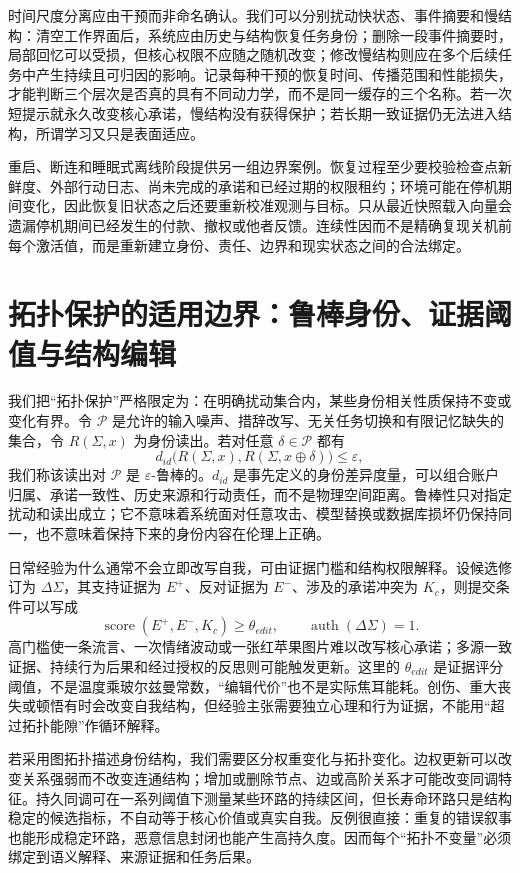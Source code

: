 时间尺度分离应由干预而非命名确认。我们可以分别扰动快状态、事件摘要和慢结构：清空工作界面后，系统应由历史与结构恢复任务身份；删除一段事件摘要时，局部回忆可以受损，但核心权限不应随之随机改变；修改慢结构则应在多个后续任务中产生持续且可归因的影响。记录每种干预的恢复时间、传播范围和性能损失，才能判断三个层次是否真的具有不同动力学，而不是同一缓存的三个名称。若一次短提示就永久改变核心承诺，慢结构没有获得保护；若长期一致证据仍无法进入结构，所谓学习又只是表面适应。

重启、断连和睡眠式离线阶段提供另一组边界案例。恢复过程至少要校验检查点新鲜度、外部行动日志、尚未完成的承诺和已经过期的权限租约；环境可能在停机期间变化，因此恢复旧状态之后还要重新校准观测与目标。只从最近快照载入向量会遗漏停机期间已经发生的付款、撤权或他者反馈。连续性因而不是精确复现关机前每个激活值，而是重新建立身份、责任、边界和现实状态之间的合法绑定。

\section{拓扑保护的适用边界：鲁棒身份、证据阈值与结构编辑}
\label{sec:section_6628}

我们把“拓扑保护”严格限定为：在明确扰动集合内，某些身份相关性质保持不变或变化有界。令 $\mathcal{P}$ 是允许的输入噪声、措辞改写、无关任务切换和有限记忆缺失的集合，令 $R(\Sigma,x)$ 为身份读出。若对任意 $\delta\in\mathcal{P}$ 都有
\[
d_{id}\bigl(R(\Sigma,x),R(\Sigma,x\oplus\delta)\bigr)\le\varepsilon,
\]
我们称该读出对 $\mathcal{P}$ 是 $\varepsilon$-鲁棒的。$d_{id}$ 是事先定义的身份差异度量，可以组合账户归属、承诺一致性、历史来源和行动责任，而不是物理空间距离。鲁棒性只对指定扰动和读出成立；它不意味着系统面对任意攻击、模型替换或数据库损坏仍保持同一，也不意味着保持下来的身份内容在伦理上正确。

日常经验为什么通常不会立即改写自我，可由证据门槛和结构权限解释。设候选修订为 $\Delta\Sigma$，其支持证据为 $E^+$、反对证据为 $E^-$、涉及的承诺冲突为 $K_c$，则提交条件可以写成
\[
\operatorname{score}(E^+,E^-,K_c)\ge \theta_{edit},
\qquad
\operatorname{auth}(\Delta\Sigma)=1.
\]
高门槛使一条流言、一次情绪波动或一张红苹果图片难以改写核心承诺；多源一致证据、持续行为后果和经过授权的反思则可能触发更新。这里的 $\theta_{edit}$ 是证据评分阈值，不是温度乘玻尔兹曼常数，“编辑代价”也不是实际焦耳能耗。创伤、重大丧失或顿悟有时会改变自我结构，但经验主张需要独立心理和行为证据，不能用“超过拓扑能隙”作循环解释。

若采用图拓扑描述身份结构，我们需要区分权重变化与拓扑变化。边权更新可以改变关系强弱而不改变连通结构；增加或删除节点、边或高阶关系才可能改变同调特征。持久同调可在一系列阈值下测量某些环路的持续区间，但长寿命环路只是结构稳定的候选指标，不自动等于核心价值或真实自我。反例很直接：重复的错误叙事也能形成稳定环路，恶意信息封闭也能产生高持久度。因而每个“拓扑不变量”必须绑定到语义解释、来源证据和任务后果。

